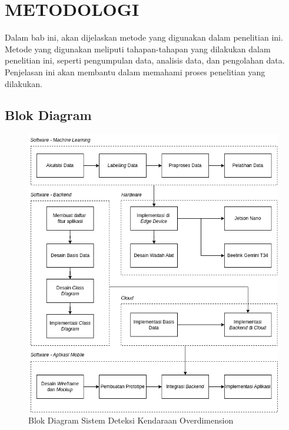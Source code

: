 \chapter{METODOLOGI}
\label{chap:metodologi}


Dalam bab ini, akan dijelaskan metode yang digunakan dalam penelitian ini. Metode yang digunakan meliputi tahapan-tahapan yang dilakukan dalam penelitian ini, seperti pengumpulan data, analisis data, dan pengolahan data. Penjelasan ini akan membantu dalam memahami proses penelitian yang dilakukan.

\section{Blok Diagram}

\begin{figure}[htbp]
  \centering

  \includegraphics[scale=0.55]{gambar/bab3-block-diagram.png}

  \caption{Blok Diagram Sistem Deteksi Kendaraan Overdimension}
  \label{fig:blockdiagrammethod}
\end{figure}

